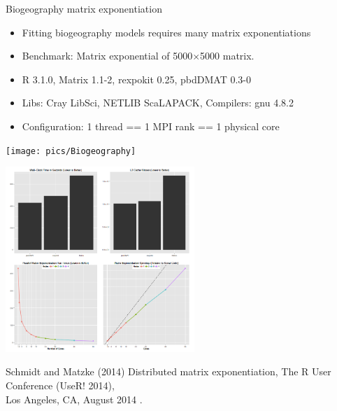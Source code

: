 \begin{frame}
  \begin{block}{Biogeography matrix exponentiation}
    \begin{minipage}{5cm}
      \begin{itemize}\tiny
      \item Fitting biogeography models requires many matrix exponentiations
      \item Benchmark: Matrix exponential of 5000$\times$5000 matrix.
      \item R 3.1.0, Matrix 1.1-2, rexpokit 0.25, pbdDMAT 0.3-0
      \item Libs: Cray LibSci, NETLIB ScaLAPACK, Compilers: gnu 4.8.2
      \item Configuration: 1 thread == 1 MPI rank == 1 physical core
      \end{itemize}
      \vspace{-4ex}
      \begin{center}
        \texttt{[image: pics/Biogeography]}
      \end{center}
    \end{minipage}
    \begin{minipage}{6.9cm}
      \includegraphics[trim=1mm 1mm 1mm 1mm,clip=true,height=7cm]{pics/MatExp}
    \end{minipage}
  \end{block}
  \begin{raggedright}\tiny
    Schmidt and Matzke (2014) Distributed matrix exponentiation, The R
    User Conference (UseR! 2014), \\[-2ex] Los Angeles, CA, August 2014 .
  \end{raggedright}
\end{frame}
